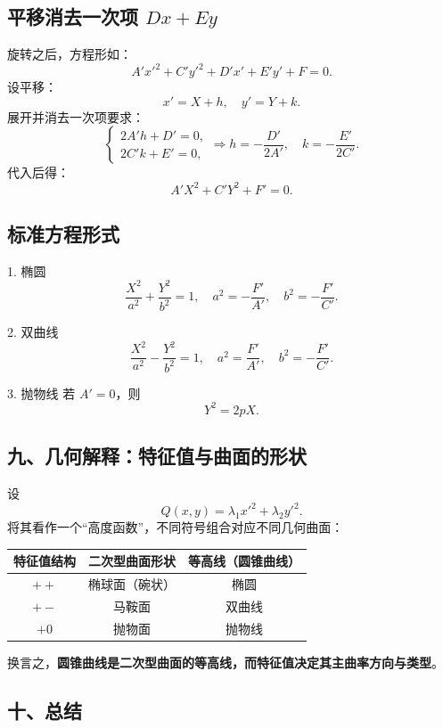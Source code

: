\documentclass{article}
\begin{document}
\subsection{平移消去一次项 \(Dx + Ey\)}

旋转之后，方程形如：
\[
A'x'^2 + C'y'^2 + D'x' + E'y' + F = 0.
\]
设平移：
\[
x' = X + h,\quad y' = Y + k.
\]
展开并消去一次项要求：
\[
\begin{cases}
	2A'h + D' = 0,\\
	2C'k + E' = 0,
\end{cases}
\Rightarrow
h = -\dfrac{D'}{2A'}, \quad k = -\dfrac{E'}{2C'}.
\]
代入后得：
\[
A'X^2 + C'Y^2 + F' = 0.
\]


\subsection{标准方程形式}

1. 椭圆
\[
\frac{X^2}{a^2} + \frac{Y^2}{b^2} = 1, \quad
a^2 = -\frac{F'}{A'},\quad b^2 = -\frac{F'}{C'}.
\]

2. 双曲线
\[
\frac{X^2}{a^2} - \frac{Y^2}{b^2} = 1, \quad
a^2 = \frac{F'}{A'},\quad b^2 = -\frac{F'}{C'}.
\]

3. 抛物线
若 \(A' = 0\)，则
\[
Y^2 = 2pX.
\]


\subsection*{九、几何解释：特征值与曲面的形状}

设
\[
Q(x, y) = \lambda_1 x'^2 + \lambda_2 y'^2.
\]
将其看作一个“高度函数”，不同符号组合对应不同几何曲面：

\begin{table}[h]
	\centering
	\begin{tabular}{|c|c|c|}
		\hline
		特征值结构 & 二次型曲面形状 & 等高线（圆锥曲线）  \\
		\hline
		 \(++\) & 椭球面（碗状） & 椭圆 \\
		\hline
		\(+-\) & 马鞍面 & 双曲线 \\
		\hline
		\(+0\) & 抛物面 & 抛物线 \\
		\hline
	\end{tabular}
\end{table}

换言之，\textbf{圆锥曲线是二次型曲面的等高线，而特征值决定其主曲率方向与类型}。

\subsection*{十、总结}
\end{document}
